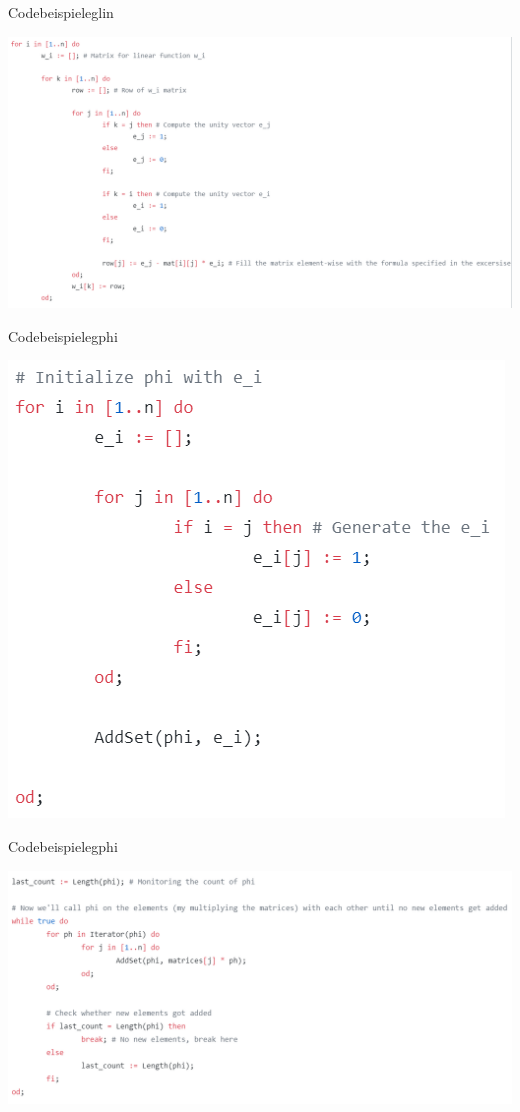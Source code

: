 \documentclass[9pt]{beamer}
\begin{document}
\begin{frame}{Codebeispiele}{glin}
\begin{center}
\includegraphics[scale=0.5]{assets/glin_code.png}
\end{center}
\end{frame}

\begin{frame}{Codebeispiele}{gphi}
\begin{center}
\includegraphics[scale=0.75]{assets/gphi_code_1.png}
\end{center}
\end{frame}

\begin{frame}{Codebeispiele}{gphi}
\begin{center}
\includegraphics[scale=0.59]{assets/gphi_code_2.png}
\end{center}
\end{frame}
\end{document}
